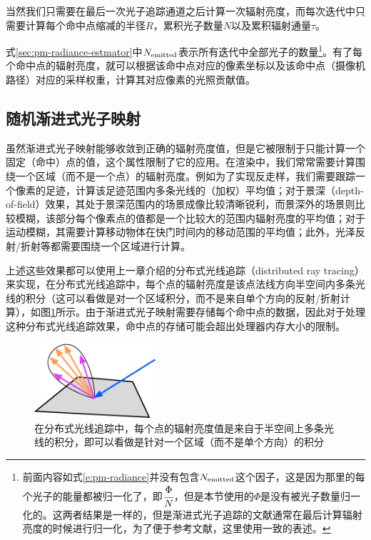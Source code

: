 当然我们只需要在最后一次光子追踪通道之后计算一次辐射亮度，而每次迭代中只需要计算每个命中点缩减的半径$R$，累积光子数量$N$以及累积辐射通量$\tau$。

式\ref{sec:pm-radiance-estmator}中$N_{\rm emitted}$表示所有迭代中全部光子的数量\footnote{前面内容如式\ref{e:pm-radiance}并没有包含$N_{\rm emitted}$这个因子，这是因为那里的每个光子的能量都被归一化了，即$ \cfrac{\Phi}{N}$，但是本节使用的$\Phi$是没有被光子数量归一化的。这两者结果是一样的，但是渐进式光子追踪的文献通常在最后计算辐射亮度的时候进行归一化，为了便于参考文献，这里使用一致的表述。}。有了每个命中点的辐射亮度，就可以根据该命中点对应的像素坐标以及该命中点（摄像机路径）对应的采样权重，计算其对应像素的光照贡献值。






\subsection{随机渐进式光子映射}\label{sec:pm-stochastic-ppm}
虽然渐进式光子映射能够收敛到正确的辐射亮度值，但是它被限制于只能计算一个固定（命中）点的值，这个属性限制了它的应用。在渲染中，我们常常需要计算围绕一个区域（而不是一个点）的辐射亮度。例如为了实现反走样，我们需要跟踪一个像素的足迹，计算该足迹范围内多条光线的（加权）平均值；对于景深（depth-of-field）效果，其处于景深范围内的场景成像比较清晰锐利，而景深外的场景则比较模糊，该部分每个像素点的值都是一个比较大的范围内辐射亮度的平均值；对于运动模糊，其需要计算移动物体在快门时间内的移动范围的平均值；此外，光泽反射/折射等都需要围绕一个区域进行计算。

上述这些效果都可以使用上一章介绍的分布式光线追踪（distributed ray tracing）来实现，在分布式光线追踪\cite{a:DistributedRayTracing}中，每个点的辐射亮度是该点法线方向半空间内多条光线的积分（这可以看做是对一个区域积分，而不是来自单个方向的反射/折射计算），如图\ref{f:pm-distributed-rt}所示。由于渐进式光子映射需要存储每个命中点的数据，因此对于处理这种分布式光线追踪效果，命中点的存储可能会超出处理器内存大小的限制。

\begin{figure}
	\sidecaption
	\includegraphics[width=0.4\textwidth]{figures/pm/distributed-rt}
	\caption{在分布式光线追踪中，每个点的辐射亮度值是来自于半空间上多条光线的积分，即可以看做是针对一个区域（而不是单个方向）的积分}
	\label{f:pm-distributed-rt}
\end{figure}

